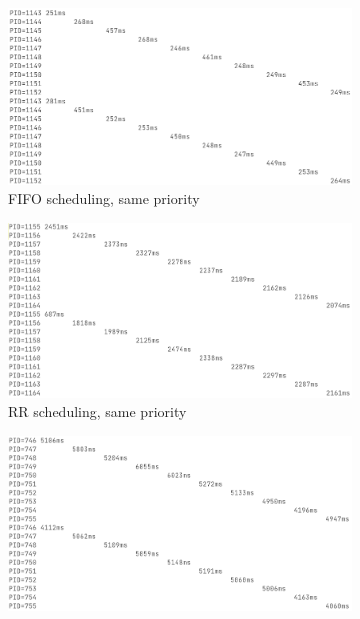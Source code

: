 \documentclass[11pt]{article}
\begin{document}
\begin{figure}[ht]
  \begin{subfigure}{.5\textwidth}
    \centering
    \includegraphics[width=\textwidth]{FIFO-example.png}
    \caption{FIFO scheduling, same priority}
    \label{fig:fifosame}
  \end{subfigure}
  \begin{subfigure}{.5\textwidth}
    \centering
    \includegraphics[width=\textwidth]{RR-step-example.png}
    \caption{RR scheduling, same priority}
    \label{fig:rrsame}
  \end{subfigure}
  \newline
  \begin{subfigure}{.5\textwidth}
    \centering
    \includegraphics[width=\textwidth]{WRR-sameW-example.png}

\end{subfigure}
\end{figure}
\end{document}
